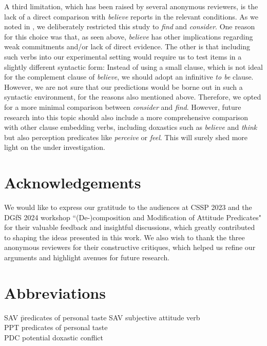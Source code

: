 \documentclass[output=paper,colorlinks,citecolor=brown]{langscibook}
\begin{document}
A third limitation, which has been raised by several anonymous reviewers, is the lack of a direct comparison with \textit{believe} reports in the relevant conditions. As we noted in , we deliberately restricted this study to \textit{find} and \textit{consider}. One reason for this choice was that, as seen above, \textit{believe} has other implications regarding weak commitments and/or lack of direct evidence. The other is that including such verbs into our experimental setting would require us to test items in a slightly different syntactic form: Instead of using a small clause, which is not ideal for the complement clause of \textit{believe}, we should adopt an infinitive \textit{to be} clause. However, we are not sure that our predictions would be borne out in such a syntactic environment, for the reasons also mentioned above. Therefore, we opted for a more minimal comparison between \textit{consider} and \textit{find}. However, future research into this topic should also include a more comprehensive comparison with other clause embedding verbs, including doxastics such as \textit{believe} and \textit{think} but also perception predicates like \textit{perceive} or \textit{feel}. This will surely shed more light on the  under investigation. 

\section*{Acknowledgements}
We would like to express our gratitude to the audiences at CSSP 2023 and the DGfS 2024 workshop ``(De-)composition and Modification of Attitude Predicates" for their valuable feedback and insightful discussions, which greatly contributed to shaping the ideas presented in this work. We also wish to thank the three anonymous reviewers for their constructive critiques, which helped us refine our arguments and highlight avenues for future research.

\clearpage
\section*{Abbreviations}
\begin{multicols}{2}
\begin{tabbing}
SAV \hspace{1em} \= predicates of personal taste\kill
SAV \> subjective attitude verb\\
PPT \> predicates of personal taste\\
PDC \> potential doxastic conflict\\
\end{tabbing}
\end{multicols}

\sloppy

\printbibliography[heading=subbibliography,notkeyword=this]
\end{document}
